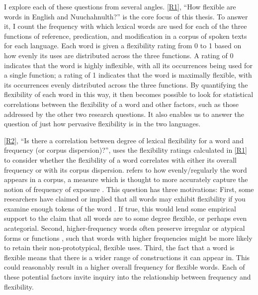 I explore each of these questions from several angles. \ref{R1}, \enquote{How flexible are words in English and Nuuchahnulth?} is the core focus of this thesis. To answer it, I count the frequency with which lexical words are used for each of the three functions of reference, predication, and modification in a corpus of spoken texts for each language. Each word is given a flexibility rating from 0 to 1 based on how evenly its uses are distributed across the three functions. A rating of 0 indicates that the word is highly inflexible, with all its occurrences being used for a single function; a rating of 1 indicates that the word is maximally flexible, with its occurrences evenly distributed across the three functions. By quantifying the flexibility of each word in this way, it then becomes possible to look for statistical correlations between the flexibility of a word and other factors, such as those addressed by the other two research questions. It also enables us to answer the question of just how pervasive flexibility is in the two languages.

\ref{R2}, \enquote{Is there a correlation between degree of lexical flexibility for a word and frequency (or corpus dispersion)?}, uses the flexibility ratings calculated in \ref{R1} to consider whether the flexibility of a word correlates with either its overall frequency or with its corpus dispersion.  refers to how evenly/regularly the word appears in a corpus, a measure which is thought to more accurately capture the notion of frequency of exposure \parencites{Gries2008}{Griesfc}. This question has three motivations: First, some researchers have claimed or implied that all words may exhibit flexibility if you examine enough tokens of the word \parencite[77]{MoselHovdhaugen1992}. If true, this would lend some empirical support to the claim that all words are to some degree flexible, or perhaps even acategorial. Second, higher-frequency words often preserve irregular or atypical forms or functions \parencite[Ch.~13]{Bybee2007}, such that words with higher frequencies might be more likely to retain their non-prototypical, flexible uses. Third, the fact that a word is flexible means that there is a wider range of constructions it can appear in. This could reasonably result in a higher overall frequency for flexible words. Each of these potential factors invite inquiry into the relationship between frequency and flexibility.

